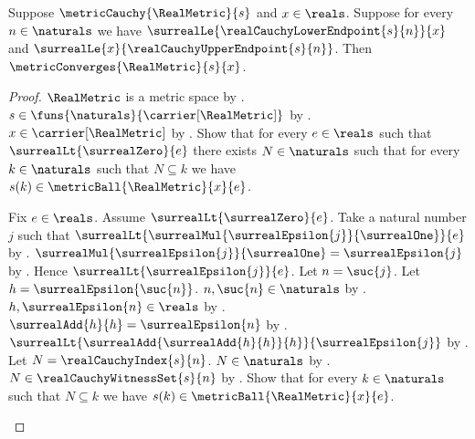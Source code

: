 \begin{theorem}\label{real_cauchy_converges_to_nested_point}
    Suppose $\metricCauchy{\RealMetric}{s}$ and $x\in\reals$.
    Suppose for every $n\in\naturals$ we have
        $\surrealLe{\realCauchyLowerEndpoint{s}{n}}{x}$ and
        $\surrealLe{x}{\realCauchyUpperEndpoint{s}{n}}$.
    Then $\metricConverges{\RealMetric}{s}{x}$.
\end{theorem}
\begin{proof}
    $\RealMetric$ is a metric space
        by .
    $s\in\funs{\naturals}{\carrier[\RealMetric]}$
        by .
    $x\in\carrier[\RealMetric]$
        by .
    Show that for every $e\in\reals$ such that
        $\surrealLt{\surrealZero}{e}$ there exists $N\in\naturals$
        such that for every $k\in\naturals$ such that $N\subseteq k$
            we have $s(k)\in\metricBall{\RealMetric}{x}{e}$.
    \begin{subproof}
        Fix $e\in\reals$.
        Assume $\surrealLt{\surrealZero}{e}$.
        Take a natural number $j$ such that
            $\surrealLt{
                \surrealMul{\surrealEpsilon{j}}{\surrealOne}}{e}$
            by
            .
        $\surrealMul{\surrealEpsilon{j}}{\surrealOne}
            =\surrealEpsilon{j}$
            by .
        Hence $\surrealLt{\surrealEpsilon{j}}{e}$.
        Let $n=\suc{j}$.
        Let $h=\surrealEpsilon{\suc{n}}$.
        $n,\suc{n}\in\naturals$ by .
        $h,\surrealEpsilon{n}\in\reals$
            by .
        $\surrealAdd{h}{h}=\surrealEpsilon{n}$
            by .
        $\surrealLt{
            \surrealAdd{\surrealAdd{h}{h}}{h}}
            {\surrealEpsilon{j}}$
            by .
        Let $N=\realCauchyIndex{s}{n}$.
        $N\in\naturals$ by .
        $N\in\realCauchyWitnessSet{s}{n}$
            by .
        Show that for every $k\in\naturals$ such that $N\subseteq k$
            we have $s(k)\in\metricBall{\RealMetric}{x}{e}$.
\end{subproof}
\end{proof}
